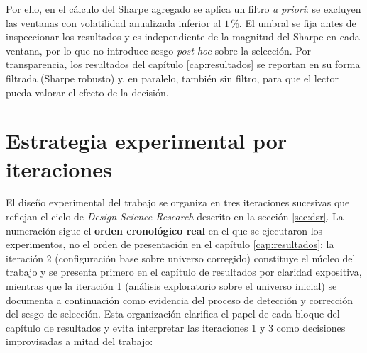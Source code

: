 \documentclass[IB,a4paper]{TFUOC}
\begin{document}
Por ello, en el cálculo del Sharpe agregado se aplica un filtro \textit{a priori}: se excluyen las ventanas con volatilidad anualizada inferior al $1$\,\%. El umbral se fija antes de inspeccionar los resultados y es independiente de la magnitud del Sharpe en cada ventana, por lo que no introduce sesgo \textit{post-hoc} sobre la selección. Por transparencia, los resultados del capítulo \ref{cap:resultados} se reportan en su forma filtrada (Sharpe robusto) y, en paralelo, también sin filtro, para que el lector pueda valorar el efecto de la decisión.

\section{Estrategia experimental por iteraciones}
\label{sec:estrategia_iteraciones}

El diseño experimental del trabajo se organiza en tres iteraciones sucesivas que reflejan el ciclo de \textit{Design Science Research} descrito en la sección \ref{sec:dsr}. La numeración sigue el \textbf{orden cronológico real} en el que se ejecutaron los experimentos, no el orden de presentación en el capítulo \ref{cap:resultados}: la iteración 2 (configuración base sobre universo corregido) constituye el núcleo del trabajo y se presenta primero en el capítulo de resultados por claridad expositiva, mientras que la iteración 1 (análisis exploratorio sobre el universo inicial) se documenta a continuación como evidencia del proceso de detección y corrección del sesgo de selección. Esta organización clarifica el papel de cada bloque del capítulo de resultados y evita interpretar las iteraciones 1 y 3 como decisiones improvisadas a mitad del trabajo:
\end{document}
